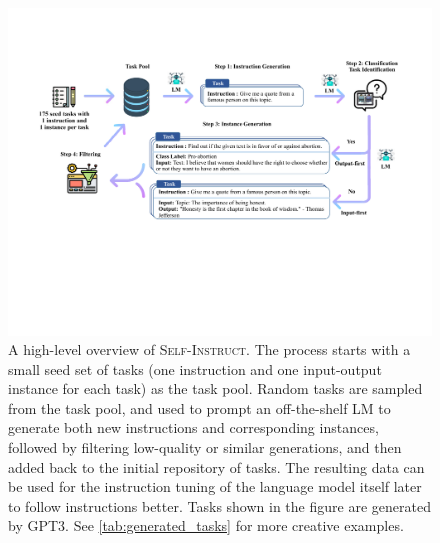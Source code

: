 \documentclass[11pt]{article}
\newcommand{\daniel}[1]{\textcolor{blue}{[DK: #1]}}
\newcommand{\nascomment}[1]{\textcolor{blue}{\textbf{[#1 -- \textsc{nas}]}}}
\newcommand{\name}{\textsc{Self-Instruct}}
\newcommand{\gptthree}{\textsc{GPT3}}
\begin{document}
\begin{figure}[ht]
    \centering
    \includegraphics[width=\textwidth]{figures/data_generation_pipeline_v5.pdf}
    \caption{
     A high-level overview of \name{}. 
     The process starts with a small seed set of tasks (one instruction and one input-output instance for each task) as the task pool. 
     Random tasks are sampled from the task pool, and used to prompt an off-the-shelf LM to generate both new instructions and corresponding instances, 
     followed by filtering low-quality or similar generations, and then added back to the initial repository of tasks. The resulting data can be used for the instruction tuning of the language model itself later to follow instructions better. Tasks shown in the figure are generated by \gptthree{}. See \autoref{tab:generated_tasks} for more creative examples.
    }
    \label{fig:pipeline}
\end{figure}
\end{document}
